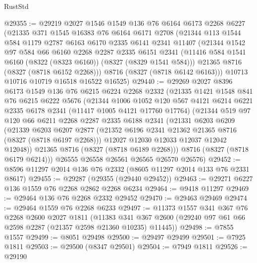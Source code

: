 \begin{lexlean}{RustStd}
\begin{coremodule}
{\begin{coremodule}
{{{{{{{{{{{{{{{{{{{{{{{{{{{{{{{{{{{{{{{{{{{{{{{{{{{{{{@29355 := @29219
    @2027
    @1546
    @1549
    @136
    @76
    @6164
    @6173
    @2268
    @6227
    (@21335
      @371
      @1545
      @16383
      @76
      @6164
      @6171
      @2708
      (@21344
        @113
        @1544
        @584
        @1179
        @2787
        @6163
        @6170
        @2335
        @6141
        @2341
        @11407
        (@21344
          @1542
          @97
          @584
          @66
          @6160
          @2268
          @2287
          @2335
          @6151
          @2341
          (@11416 @584 @1541 @6160 (@8322 (@8323 @6160)) (@8327 (@8329 @1541 @584)))
          @21365
          @8716
          (@8327 (@8718 @6152 @2268)))
        @8716
        (@8327 (@8718 @6142 @6163)))
      @10713
      @10716
      @10719
      @16518
      @16522
      @16525)
@29440 := @29269
    @2027
    @8396
    @6173
    @1549
    @136
    @76
    @6215
    @6224
    @2268
    @2332
    (@21335
      @1421
      @1548
      @841
      @76
      @6215
      @6222
      @5676
      (@21344
        @1006
        @1052
        @120
        @567
        @4121
        @6214
        @6221
        @2335
        @6178
        @2341
        (@11417 @1005 @4121 @17760 @17764)
        (@21344
          @519
          @97
          @120
          @66
          @6211
          @2268
          @2287
          @2335
          @6188
          @2341
          (@21331
            @6203
            @6209
            (@21339
              @6203
              @6207
              @2877
              (@21352 @6196 @2341 @21362 @21365 @8716 (@8327 (@8718 @6197 @2268)))
              @12027
              @12030
              @12033
              @12037
              @12042
              @12048))
          @21365
          @8716
          (@8327 (@8718 @6189 @2268)))
        @8716
        (@8327 (@8718 @6179 @6214)))
      @26555
      @26558
      @26561
      @26565
      @26570
      @26576)
@29452 := @8596 @11297 @2014 @136 @76 @2332 (@8605 @11297 @2014 @133 @76 @2331 @8617)
@29455 := @29287 (@29355 (@29440 @29452))
@29463 := @29271 @6227 @136 @1559 @76 @2268 @2862 @2268 @6234
@29464 := @9418 @11297
@29469 := @29464 @136 @76 @2268 @2332 @29452
@29470 := @29463 @29469
@29474 := @29464 @1559 @76 @2268 @6233
@29497 := @11373
    @1557
    @341
    @367
    @76
    @2268
    @2600
    @2027
    @1811
    (@11383 @341 @367 @2600 (@29240 @97 @61 @66 @2598 @2287 (@21357 @2598 @21360 @10235) @11445))
@29498 := @7855 @1557
@29499 := @8051 @29498
@29500 := @29497 @29499
@29501 := @7925 @1811
@29503 := @29500 (@8347 @29501)
@29504 := @7949 @1811
@29526 := @29190
}}}}}}}}}}}}}}}}}}}}}}}}}}}}}}}}}}}}}}}}}}}}}}}}}}}}}}
\end{coremodule}}
\end{coremodule}
\end{lexlean}
